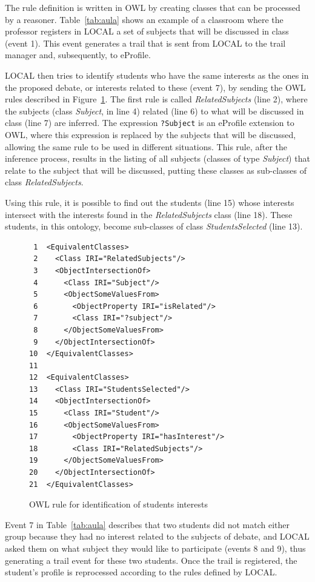 \documentclass{svjour3}                     %
\begin{document}
The rule definition is written in OWL by creating classes that can be processed by a reasoner. Table~\ref{tab:aula} shows an example of a classroom where the professor registers in LOCAL a set of subjects that will be discussed in class (event 1). This event generates a trail that is sent from LOCAL to the trail manager and, subsequently, to eProfile.

LOCAL then tries to identify students who have the same interests as the ones in the proposed debate, or interests related to these (event 7), by sending the OWL rules described in Figure~\ref{fig:regra1}. The first rule is called {\em RelatedSubjects} (line 2), where the subjects (class {\em Subject}, in line 4) related (line 6) to what will be discussed in class (line 7) are inferred. The expression {\tt ?Subject} is an eProfile extension to OWL, where this expression is replaced by the subjects that will be discussed, allowing the same rule to be used in different situations. This rule, after the inference process, results in the listing of all subjects (classes of type {\em Subject}) that relate to the subject that will be discussed, putting these classes as sub-classes of class {\em RelatedSubjects}.

Using this rule, it is possible to find out the students (line 15) whose interests intersect with the interests found in the {\em RelatedSubjects} class (line 18). These students, in this ontology, become sub-classes of class {\em StudentsSelected} (line 13).

\begin{figure}[!t]
\begin{verbatim}
 1  <EquivalentClasses>
 2    <Class IRI="RelatedSubjects"/>
 3    <ObjectIntersectionOf>
 4      <Class IRI="Subject"/>
 5      <ObjectSomeValuesFrom>
 6        <ObjectProperty IRI="isRelated"/>
 7        <Class IRI="?subject"/>
 8      </ObjectSomeValuesFrom>
 9    </ObjectIntersectionOf>
10  </EquivalentClasses>
11
12  <EquivalentClasses>
13    <Class IRI="StudentsSelected"/>
14    <ObjectIntersectionOf>
15      <Class IRI="Student"/>
16      <ObjectSomeValuesFrom>
17        <ObjectProperty IRI="hasInterest"/>
18        <Class IRI="RelatedSubjects"/>
19      </ObjectSomeValuesFrom>
20    </ObjectIntersectionOf>
21  </EquivalentClasses>
\end{verbatim}
  \caption{OWL rule for identification of students interests}
  \label{fig:regra1}
\end{figure}

Event 7 in Table~\ref{tab:aula} describes that two students did not match either group because they had no interest related to the subjects of debate, and LOCAL asked them on what subject they would like to participate (events 8 and 9), thus generating a trail event for these two students. Once the trail is registered, the student's profile is reprocessed according to the rules defined by LOCAL.
\end{document}
